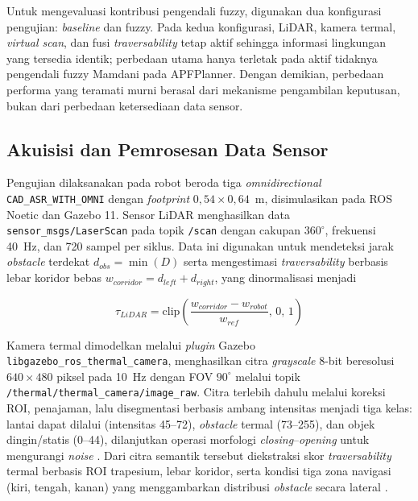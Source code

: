 \documentclass[10pt,twocolumn]{article}
\begin{document}
Untuk mengevaluasi kontribusi pengendali fuzzy, digunakan dua konfigurasi pengujian: \textit{baseline} dan fuzzy. Pada kedua konfigurasi, LiDAR, kamera termal, \textit{virtual scan}, dan fusi \textit{traversability} tetap aktif sehingga informasi lingkungan yang tersedia identik; perbedaan utama hanya terletak pada aktif tidaknya pengendali fuzzy Mamdani pada APFPlanner. Dengan demikian, perbedaan performa yang teramati murni berasal dari mekanisme pengambilan keputusan, bukan dari perbedaan ketersediaan data sensor.

\subsection{Akuisisi dan Pemrosesan Data Sensor}

Pengujian dilaksanakan pada robot beroda tiga \textit{omnidirectional} \texttt{CAD\_ASR\_WITH\_OMNI} dengan \textit{footprint} $0{,}54\times0{,}64$~m, disimulasikan pada ROS Noetic dan Gazebo 11. Sensor LiDAR menghasilkan data \texttt{sensor\_msgs/LaserScan} pada topik \texttt{/scan} dengan cakupan $360^\circ$, frekuensi 40~Hz, dan 720 sampel per siklus. Data ini digunakan untuk mendeteksi jarak \textit{obstacle} terdekat $d_{obs}=\min(D)$ serta mengestimasi \textit{traversability} berbasis lebar koridor bebas $w_{corridor}=d_{left}+d_{right}$, yang dinormalisasi menjadi

\begin{equation}
\tau_{LiDAR}=\mathrm{clip}\!\left(\frac{w_{corridor}-w_{robot}}{w_{ref}},\,0,\,1\right)
\label{eq:trav_lidar}
\end{equation}

Kamera termal dimodelkan melalui \textit{plugin} Gazebo \texttt{libgazebo\_ros\_thermal\_camera}, menghasilkan citra \textit{grayscale} 8-bit beresolusi $640\times480$ piksel pada 10~Hz dengan FOV $90^\circ$ melalui topik \texttt{/thermal/thermal\_camera/image\_raw}. Citra terlebih dahulu melalui koreksi ROI, penajaman, lalu disegmentasi berbasis ambang intensitas menjadi tiga kelas: lantai dapat dilalui (intensitas 45--72), \textit{obstacle} termal (73--255), dan objek dingin/statis (0--44), dilanjutkan operasi morfologi \textit{closing}--\textit{opening} untuk mengurangi \textit{noise} \cite{Castro2016}. Dari citra semantik tersebut diekstraksi skor \textit{traversability} termal berbasis ROI trapesium, lebar koridor, serta kondisi tiga zona navigasi (kiri, tengah, kanan) yang menggambarkan distribusi \textit{obstacle} secara lateral \cite{Sevastopoulos2022}.
\end{document}
